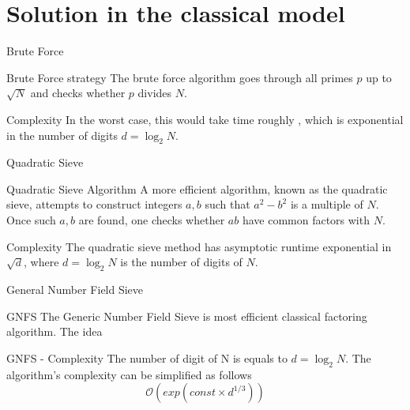 \documentclass{beamer}
\begin{document}
    \section{Solution in the classical model}
    \begin{frame}{Brute Force}
        \begin{alertblock}{Brute Force strategy}
            The brute force algorithm goes through all primes $p$ up to $\sqrt{N}$ and checks whether $p$ divides $N$.
        \end{alertblock}
        \begin{exampleblock}{Complexity}
            In the worst case, this would take time roughly , which is exponential in the number of digits $d = \log_2N$.
        \end{exampleblock}
    \end{frame}
    \begin{frame}{Quadratic Sieve}
        \begin{alertblock}{Quadratic Sieve Algorithm}
            A more efficient algorithm, known as the quadratic sieve, attempts to construct integers $a,b$ such that $a^2-b^2$ is a multiple of $N$.
            Once such $a,b$ are found, one checks whether $a b$ have common factors with $N$.
        \end{alertblock}
        \begin{exampleblock}{Complexity}
            The quadratic sieve method has asymptotic runtime exponential in $\sqrt{d}$, where $d = \log_2N$ is the number of digits of $N$.
        \end{exampleblock}
    \end{frame}
    \begin{frame}{General Number Field Sieve}
        \begin{alertblock}{GNFS}
            The Generic Number Field Sieve is most efficient classical factoring algorithm. The idea 
        \end{alertblock}
        \begin{exampleblock}{GNFS - Complexity}
            The number of digit of N is equals to $d = \log_2N$.
            The algorithm's complexity can be simplified as follows
            $$\mathcal{O}(exp(const \times d^{1/3}))$$
        \end{exampleblock}
    \end{frame}
\end{document}
